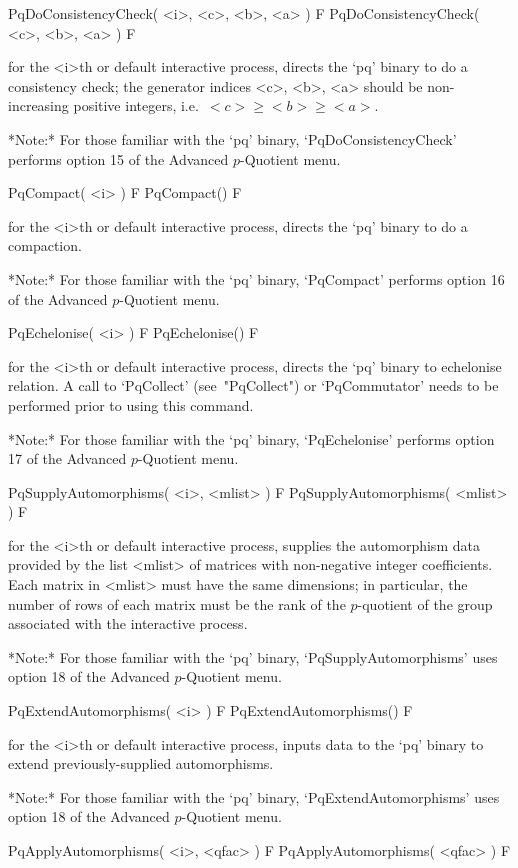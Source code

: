\>PqDoConsistencyCheck( <i>, <c>, <b>, <a> ) F
\>PqDoConsistencyCheck( <c>, <b>, <a> ) F

for the <i>th or default interactive {\ANUPQ} process, directs  the  `pq'
binary to do a consistency check; the generator  indices  <c>,  <b>,  <a>
should be non-increasing positive integers, i.e.~$<c> \ge <b> \ge <a>$.

*Note:*
For those familiar with the `pq' binary, `PqDoConsistencyCheck'  performs
option 15 of the Advanced $p$-Quotient menu.

\>PqCompact( <i> ) F
\>PqCompact() F

for the <i>th or default interactive {\ANUPQ} process, directs  the  `pq'
binary to do a compaction.

*Note:*
For those familiar with the `pq' binary, `PqCompact' performs  option  16
of the Advanced $p$-Quotient menu.

\>PqEchelonise( <i> ) F
\>PqEchelonise() F

for the <i>th or default interactive {\ANUPQ} process, directs  the  `pq'
binary to echelonise relation. A call to `PqCollect' (see~"PqCollect") or
`PqCommutator' needs to be performed prior to using this command.

*Note:*
For those familiar with the `pq' binary, `PqEchelonise'  performs  option
17 of the Advanced $p$-Quotient menu.

\>PqSupplyAutomorphisms( <i>, <mlist> ) F
\>PqSupplyAutomorphisms( <mlist> ) F

for the <i>th or  default  interactive  {\ANUPQ}  process,  supplies  the
automorphism  data  provided  by  the  list  <mlist>  of  matrices   with
non-negative integer coefficients. Each matrix in <mlist> must  have  the
same dimensions; in particular, the number of rows of each matrix must be
the rank of the $p$-quotient of the group associated with the interactive
{\ANUPQ} process.

*Note:* 
For those familiar with the  `pq'  binary,  `PqSupplyAutomorphisms'  uses
option 18 of the Advanced $p$-Quotient menu.

\>PqExtendAutomorphisms( <i> ) F
\>PqExtendAutomorphisms() F

for the <i>th or default interactive {\ANUPQ} process, inputs data to the
`pq' binary to extend previously-supplied automorphisms.

*Note:*
For those familiar with the  `pq'  binary,  `PqExtendAutomorphisms'  uses
option 18 of the Advanced $p$-Quotient menu.

\>PqApplyAutomorphisms( <i>, <qfac> ) F
\>PqApplyAutomorphisms( <qfac> ) F

